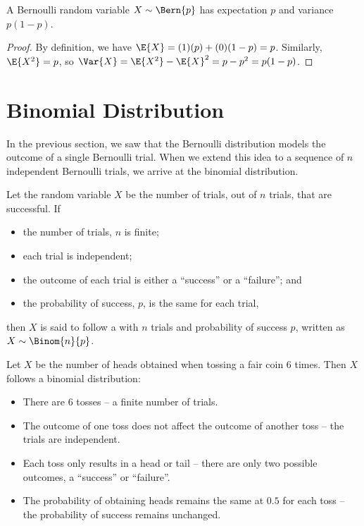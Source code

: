 \begin{proposition}
    A Bernoulli random variable $X \sim \Bern{p}$ has expectation $p$ and variance $p(1-p)$.
\end{proposition}
\begin{proof}
    By definition, we have $\E{X} = (1)(p) + (0)(1-p) = p$. Similarly, $\E{X^2} = p$, so $\Var{X} = \E{X^2} - \E{X}^2 = p - p^2 = p(1-p)$.
\end{proof}

\section{Binomial Distribution}

In the previous section, we saw that the Bernoulli distribution models the outcome of a single Bernoulli trial. When we extend this idea to a sequence of $n$ independent Bernoulli trials, we arrive at the binomial distribution.

\begin{definition}
    Let the random variable $X$ be the number of trials, out of $n$ trials, that are successful. If
    \begin{itemize}
        \item the number of trials, $n$ is finite;
        \item each trial is independent;
        \item the outcome of each trial is either a ``success'' or a ``failure''; and
        \item the probability of success, $p$, is the same for each trial,
    \end{itemize}
    then $X$ is said to follow a  with $n$ trials and probability of success $p$, written as $X \sim \Binom{n}{p}$.
\end{definition}

\begin{example}
    Let $X$ be the number of heads obtained when tossing a fair coin 6 times. Then $X$ follows a binomial distribution:
    \begin{itemize}
        \item There are 6 tosses -- a finite number of trials.
        \item The outcome of one toss does not affect the outcome of another toss -- the trials are independent.
        \item Each toss only results in a head or tail -- there are only two possible outcomes, a ``success'' or ``failure''.
        \item The probability of obtaining heads remains the same at $0.5$ for each toss -- the probability of success remains unchanged.
    \end{itemize}
\end{example}

